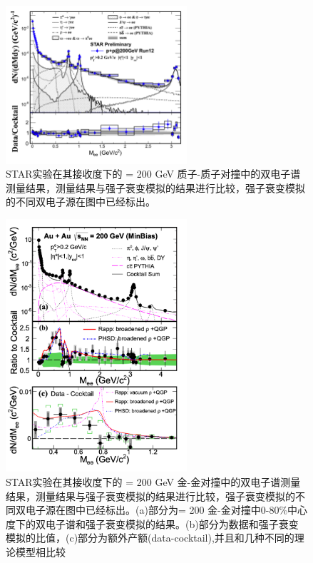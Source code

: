 \begin{figure}[htb]
    \begin{center}
    \includegraphics[width=0.6\textwidth,clip]{figures/Chapter1/STARpp.png}
    \end{center}
    \caption[STAR实验 \sNN = 200 GeV 质子-质子对撞中的双电子谱测量结果]{STAR实验在其接收度下的 \sNN = 200 GeV 质子-质子对撞中的双电子谱测量结果，测量结果与强子衰变模拟的结果进行比较，强子衰变模拟的不同双电子源在图中已经标出。}
    \label{fig:STARpp}
\end{figure}

\begin{figure}[htb]
    \begin{center}
    \includegraphics[width=0.6\textwidth,clip]{figures/Chapter1/STARAuAu200.png}
    \end{center}
    \caption[STAR实验 \sNN = 200 GeV 金-金对撞中的双电子谱测量结果]{STAR实验在其接收度下的 \sNN = 200 GeV 金-金对撞中的双电子谱测量结果，测量结果与强子衰变模拟的结果进行比较，强子衰变模拟的不同双电子源在图中已经标出。(a)部分为\sNN = 200 金-金对撞中0-80\%中心度下的双电子谱和强子衰变模拟的结果。(b)部分为数据和强子衰变模拟的比值，(c)部分为额外产额(data-cocktail),并且和几种不同的理论模型相比较 }
    \label{fig:STARAuAu}
\end{figure}


